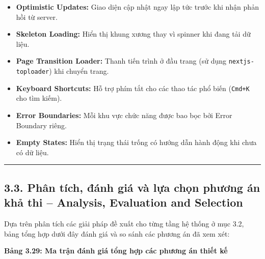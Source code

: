 \documentclass[13pt,a4paper]{extarticle}
\renewcommand{\\}{\thesislongtableorignewline\hline}%
\newcommand{\thesistabletitle}[1]{%
  \begin{center}\textbf{#1}\end{center}%
}
\providecommand{\tightlist}{%
  \setlength{\itemsep}{0pt}\setlength{\parskip}{0pt}}
\begin{document}
\begin{itemize}
\tightlist
\item
  \textbf{Optimistic Updates:} Giao diện cập nhật ngay lập tức trước khi
  nhận phản hồi từ server.
\item
  \textbf{Skeleton Loading:} Hiển thị khung xương thay vì spinner khi
  đang tải dữ liệu.
\item
  \textbf{Page Transition Loader:} Thanh tiến trình ở đầu trang (sử dụng
  \texttt{nextjs-toploader}) khi chuyển trang.
\item
  \textbf{Keyboard Shortcuts:} Hỗ trợ phím tắt cho các thao tác phổ biến
  (\texttt{Cmd+K} cho tìm kiếm).
\item
  \textbf{Error Boundaries:} Mỗi khu vực chức năng được bao bọc bởi
  Error Boundary riêng.
\item
  \textbf{Empty States:} Hiển thị trạng thái trống có hướng dẫn hành
  động khi chưa có dữ liệu.
\end{itemize}

\begin{center}\rule{0.5\linewidth}{0.5pt}\end{center}

\subsection{3.3. Phân tích, đánh giá và lựa chọn phương án khả thi --
Analysis, Evaluation and
Selection}\label{33-phuxe2n-tuxedch-ux111uxe1nh-giuxe1-vuxe0-lux1ef1a-chux1ecdn-phux1b0ux1a1ng-uxe1n-khux1ea3-thi--analysis-evaluation-and-selection}

Dựa trên phân tích các giải pháp đề xuất cho từng tầng hệ thống ở mục
3.2, bảng tổng hợp dưới đây đánh giá và so sánh các phương án đã xem
xét:

\thesistabletitle{Bảng 3.29: Ma trận đánh giá tổng hợp các phương án thiết kế}
\end{document}
